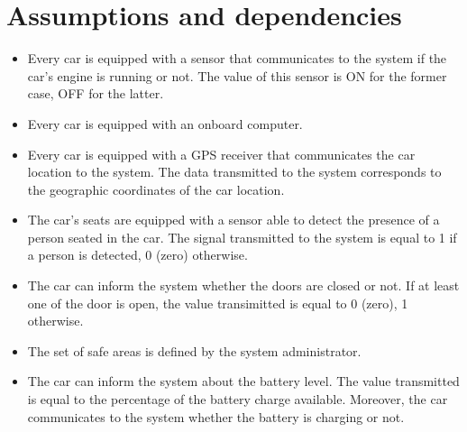 \section{Assumptions and dependencies}

\begin{itemize}
	\item Every car is equipped with a sensor that communicates to the system if the car's engine is running or not. The value of this sensor is ON for the former case, OFF for the latter.
	\item Every car is equipped with an onboard computer.
	\item Every car is equipped with a GPS receiver that communicates the car location to the system. The data transmitted to the system corresponds to the geographic coordinates of the car location.
	\item The car's seats are equipped with a sensor able to detect the presence of a person seated in the car. The signal transmitted to the system is equal to 1 if a person is detected, 0 (zero) otherwise.
	\item The car can inform the system whether the doors are closed or not. If at least one of the door is open, the value transimitted is equal to 0 (zero), 1 otherwise.
	\item The set of safe areas is defined by the system administrator.
	\item The car can inform the system about the battery level. The value transmitted is equal to the percentage of the battery charge available. Moreover, the car communicates to the system whether the battery is charging or not.
\end{itemize}
